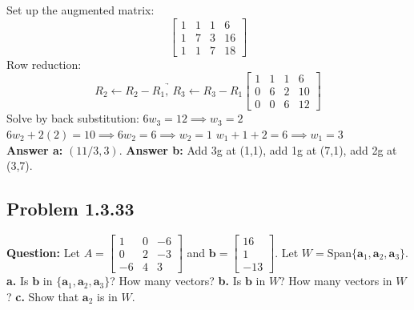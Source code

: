 \documentclass[11pt]{article}
\begin{document}
Set up the augmented matrix:
\[ \begin{bmatrix} 1 & 1 & 1 & 6 \\ 1 & 7 & 3 & 16 \\ 1 & 1 & 7 & 18 \end{bmatrix} \]
Row reduction:
\[ \underrightarrow{R_2 \leftarrow R_2 - R_1, \ R_3 \leftarrow R_3 - R_1} \begin{bmatrix} 1 & 1 & 1 & 6 \\ 0 & 6 & 2 & 10 \\ 0 & 0 & 6 & 12 \end{bmatrix} \]
Solve by back substitution:
$6w_3 = 12 \implies w_3 = 2$
$6w_2 + 2(2) = 10 \implies 6w_2 = 6 \implies w_2 = 1$
$w_1 + 1 + 2 = 6 \implies w_1 = 3$
\\
\textbf{Answer a:} $(11/3, 3)$. 
\textbf{Answer b:} Add 3g at (1,1), add 1g at (7,1), add 2g at (3,7).


\subsection*{Problem 1.3.33}
\textbf{Question:} Let $A = \begin{bmatrix} 1 & 0 & -6 \\ 0 & 2 & -3 \\ -6 & 4 & 3 \end{bmatrix}$ and $\mathbf{b} = \begin{bmatrix} 16 \\ 1 \\ -13 \end{bmatrix}$. Let $W = \text{Span}\{\mathbf{a}_1, \mathbf{a}_2, \mathbf{a}_3\}$.
\textbf{a.} Is $\mathbf{b}$ in $\{\mathbf{a}_1, \mathbf{a}_2, \mathbf{a}_3\}$? How many vectors?
\textbf{b.} Is $\mathbf{b}$ in $W$? How many vectors in $W$?
\textbf{c.} Show that $\mathbf{a}_2$ is in $W$.
\end{document}
